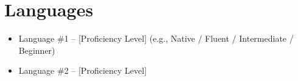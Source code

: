 \section{Languages}

\begin{itemize}
  \item Language \#1 – [Proficiency Level] (e.g., Native / Fluent / Intermediate / Beginner)
    \item Language \#2 – [Proficiency Level]
\end{itemize}
